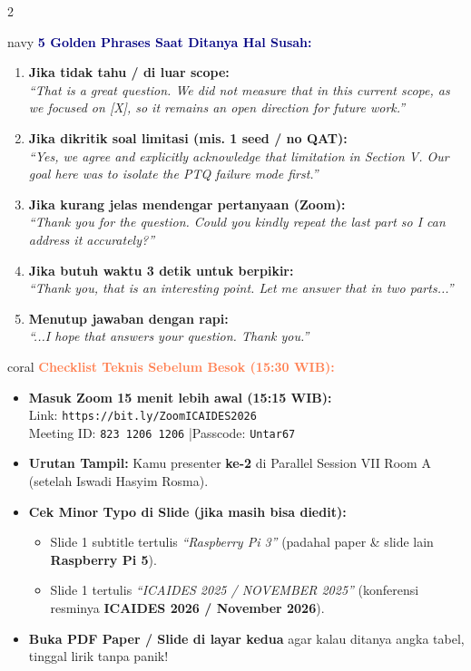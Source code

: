 \documentclass[10pt,a4paper]{article}
\begin{document}
\begin{multicols}{2}
\begin{infobox}{navy}
\textbf{\textcolor{navy}{5 Golden Phrases Saat Ditanya Hal Susah:}}
\begin{enumerate}[leftmargin=*, itemsep=3pt, topsep=2pt]
  \item \textbf{Jika tidak tahu / di luar scope:}\\
  \textit{``That is a great question. We did not measure that in this current scope, as we focused on [X], so it remains an open direction for future work.''}
  \item \textbf{Jika dikritik soal limitasi (mis. 1 seed / no QAT):}\\
  \textit{``Yes, we agree and explicitly acknowledge that limitation in Section V. Our goal here was to isolate the PTQ failure mode first.''}
  \item \textbf{Jika kurang jelas mendengar pertanyaan (Zoom):}\\
  \textit{``Thank you for the question. Could you kindly repeat the last part so I can address it accurately?''}
  \item \textbf{Jika butuh waktu 3 detik untuk berpikir:}\\
  \textit{``Thank you, that is an interesting point. Let me answer that in two parts...''}
  \item \textbf{Menutup jawaban dengan rapi:}\\
  \textit{``...I hope that answers your question. Thank you.''}
\end{enumerate}
\end{infobox}

\begin{infobox}{coral}
\textbf{\textcolor{coral}{Checklist Teknis Sebelum Besok (15:30 WIB):}}
\begin{itemize}[leftmargin=*, itemsep=3pt, topsep=2pt]
  \item \textbf{Masuk Zoom 15 menit lebih awal (15:15 WIB):}\\
  Link: \texttt{https://bit.ly/ZoomICAIDES2026}\\
  Meeting ID: \texttt{823 1206 1206} \quad|\quad Passcode: \texttt{Untar67}
  \item \textbf{Urutan Tampil:} Kamu presenter \textbf{ke-2} di Parallel Session VII Room A (setelah Iswadi Hasyim Rosma).
  \item \textbf{Cek Minor Typo di Slide (jika masih bisa diedit):}
  \begin{itemize}[leftmargin=*, itemsep=1pt]
    \item Slide 1 subtitle tertulis \textit{``Raspberry Pi 3''} (padahal paper \& slide lain \textbf{Raspberry Pi 5}).
    \item Slide 1 tertulis \textit{``ICAIDES 2025 / NOVEMBER 2025''} (konferensi resminya \textbf{ICAIDES 2026 / November 2026}).
  \end{itemize}
  \item \textbf{Buka PDF Paper / Slide di layar kedua} agar kalau ditanya angka tabel, tinggal lirik tanpa panik!
\end{itemize}
\end{infobox}
\end{multicols}
\end{document}
